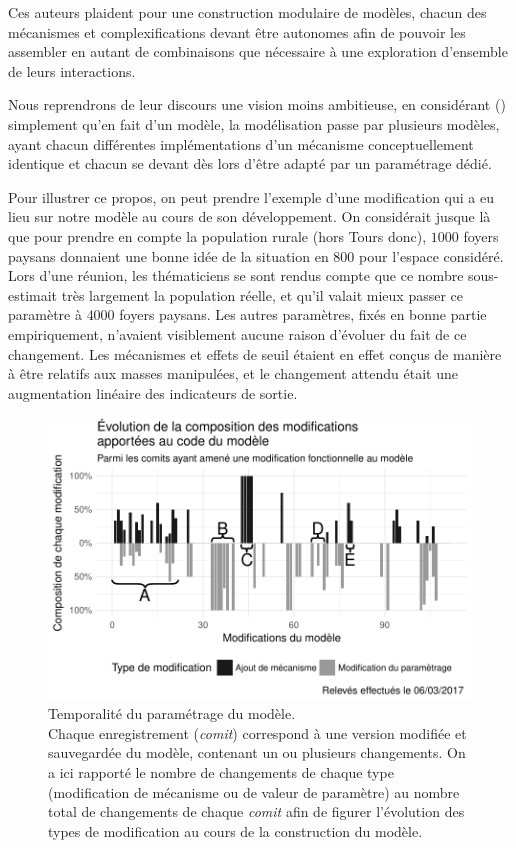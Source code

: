 Ces auteurs plaident pour une construction modulaire de modèles, chacun des mécanismes et complexifications devant être autonomes afin de pouvoir les assembler en autant de combinaisons que nécessaire à une exploration d'ensemble de leurs interactions.

Nous reprendrons de leur discours une vision moins ambitieuse, en considérant () simplement qu'en fait d'un modèle, la modélisation passe par plusieurs modèles, ayant chacun différentes implémentations d'un mécanisme conceptuellement identique et chacun se devant dès lors d'être adapté par un paramétrage dédié.

Pour illustrer ce propos, on peut prendre l'exemple d'une modification qui a eu lieu sur notre modèle au cours de son développement.
On considérait jusque là que pour prendre en compte la population rurale (hors Tours donc), $1000$ foyers paysans donnaient une bonne idée de la situation en 800 pour l'espace considéré.
Lors d'une réunion, les thématiciens se sont rendus compte que ce nombre sous-estimait très largement la population réelle, et qu'il valait mieux passer ce paramètre à $4000$ foyers paysans.
Les autres paramètres, fixés en bonne partie empiriquement, n'avaient visiblement aucune raison d'évoluer du fait de ce changement.
Les mécanismes  et effets de seuil étaient en effet conçus de manière à être relatifs aux masses manipulées, et le changement attendu était une augmentation linéaire des indicateurs de sortie.

\begin{figure}[H]
	\includegraphics[width = \linewidth]{img/plotComits.pdf}
	\caption{Temporalité du paramétrage du modèle.\\
		Chaque \og enregistrement\fg{} (\textit{comit}) correspond à une version modifiée et sauvegardée du modèle, contenant un ou plusieurs changements.
		On a ici rapporté le nombre de changements de chaque type (modification de mécanisme ou de valeur de paramètre) au nombre total de changements de chaque \textit{comit} afin de figurer l'évolution des types de modification au cours de la construction du modèle.}
	\label{fig:comits-periodes}
\end{figure}

